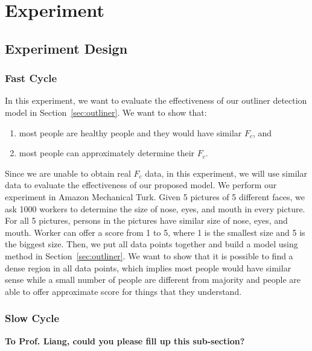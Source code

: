 \section{Experiment}\label{sec:exp}


\subsection{Experiment Design}

\subsubsection{Fast Cycle}
In this experiment, we want to evaluate the effectiveness of our outliner detection model in Section~\ref{sec:outliner}. 
We want to show that:
\begin{enumerate}
 \item most people are healthy people and they would have similar $F_c$, and 
 \item most people can approximately determine their $F_c$. 
\end{enumerate}


Since we are unable to obtain real $F_c$ data, in this experiment, we will use similar data to evaluate the 
effectiveness of our proposed model. 
We perform our experiment in Amazon Mechanical Turk. 
Given 5 pictures of 5 different faces, we ask 1000 workers to determine the size of nose, eyes, and mouth in every picture. 
For all 5 pictures, persons in the pictures have similar size of nose, eyes, and mouth. 
Worker can offer a score from 1 to 5, where 1 is the smallest size and 5 is the biggest size. 
Then, we put all data points together and build a model using method in Section~\ref{sec:outliner}. 
We want to show that it is possible to find a dense region in all data points, which implies 
most people would have similar sense while a small number of people are different from majority and people are able to 
offer approximate score for things that they understand. 


\subsubsection{Slow Cycle}
{\bf To Prof. Liang, could you please fill up this sub-section?}


